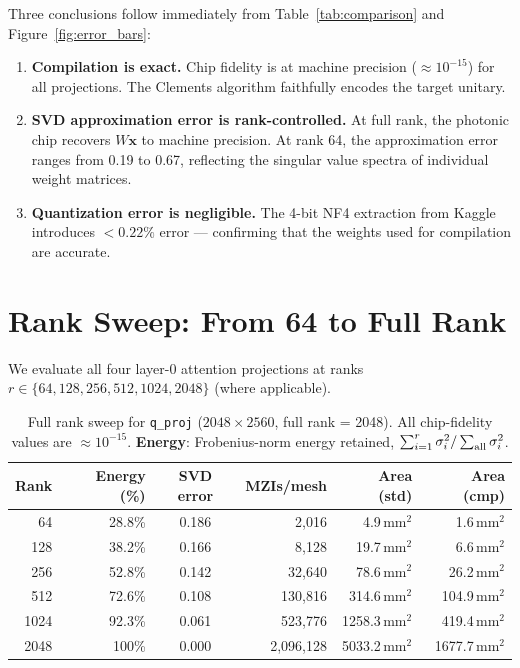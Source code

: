 \documentclass[12pt, a4paper]{article}
\begin{document}
Three conclusions follow immediately from Table~\ref{tab:comparison} and
Figure~\ref{fig:error_bars}:
\begin{enumerate}
  \item \textbf{Compilation is exact.}
        Chip fidelity is at machine precision ($\approx 10^{-15}$) for all
        projections.
        The Clements algorithm faithfully encodes the target unitary.
  \item \textbf{SVD approximation error is rank-controlled.}
        At full rank, the photonic chip recovers $W\mathbf{x}$ to machine
        precision.
        At rank 64, the approximation error ranges from 0.19 to 0.67,
        reflecting the singular value spectra of individual weight matrices.
  \item \textbf{Quantization error is negligible.}
        The 4-bit NF4 extraction from Kaggle introduces $< 0.22\%$ error ---
        confirming that the weights used for compilation are accurate.
\end{enumerate}

\section{Rank Sweep: From 64 to Full Rank}
\label{sec:results}

We evaluate all four layer-0 attention projections at ranks
$r \in \{64, 128, 256, 512, 1024, 2048\}$ (where applicable).

\begin{table}[h]
\centering
\caption{Full rank sweep for \texttt{q\_proj} ($2048 \times 2560$, full rank = 2048).
         All chip-fidelity values are $\approx 10^{-15}$.
         \textbf{Energy}: Frobenius-norm energy retained,
         $\sum_{i=1}^r \sigma_i^2 / \sum_{\rm all} \sigma_i^2$.}
\label{tab:rank_sweep_q}
\begin{tabular}{rrcrrr}
\toprule
\textbf{Rank} & \textbf{Energy (\%)} & \textbf{SVD error} & \textbf{MZIs/mesh} &
\textbf{Area (std)} & \textbf{Area (cmp)} \\
\midrule
    64 & 28.8\% & 0.186 &        2,016 &    4.9\,mm$^2$ &    1.6\,mm$^2$ \\
   128 & 38.2\% & 0.166 &        8,128 &   19.7\,mm$^2$ &    6.6\,mm$^2$ \\
   256 & 52.8\% & 0.142 &       32,640 &   78.6\,mm$^2$ &   26.2\,mm$^2$ \\
   512 & 72.6\% & 0.108 &      130,816 &  314.6\,mm$^2$ &  104.9\,mm$^2$ \\
  1024 & 92.3\% & 0.061 &      523,776 & 1258.3\,mm$^2$ &  419.4\,mm$^2$ \\
  2048 & 100\%  & 0.000 &    2,096,128 & 5033.2\,mm$^2$ & 1677.7\,mm$^2$ \\
\bottomrule
\end{tabular}
\end{table}
\end{document}
